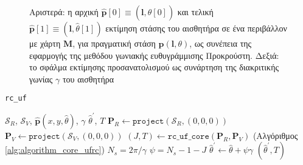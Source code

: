 \begin{figure}[h]\centering
  \vspace{0.5cm}
  
  \vspace{0.5cm}
  \caption{\small Αριστερά: η αρχική
           $\hat{\bm{p}}[0] \equiv (\bm{l},\hat{\theta}[0])$ και τελική
           $\hat{\bm{p}}[1] \equiv (\bm{l},\hat{\theta}[1])$ εκτίμηση στάσης του
           αισθητήρα σε ένα περιβάλλον με χάρτη $\bm{M}$, για πραγματική στάση
           $\bm{p}(\bm{l},\theta)$, ως συνέπεια της εφαρμογής της μεθόδου
           γωνιακής ευθυγράμμισης Προκρούστη. Δεξιά: το σφάλμα εκτίμησης
           προσανατολισμού ως συνάρτηση της διακριτικής γωνίας $\gamma$ του
           αισθητήρα}
  \label{fig:02_04_02:rc_uf}
\end{figure}


\begin{algorithm}[h]
  \caption{\texttt{rc\_uf}}
  \begin{spacing}{1.3}
  \begin{algorithmic}[1]
    \REQUIRE $\mathcal{S}_R$, $\mathcal{S}_V$, $\hat{\bm{p}}(x, y, \hat{\theta})$, $\gamma$
    \ENSURE $\hat{\theta}^\prime$, $T$
    \STATE $\bm{P}_R \leftarrow \texttt{project}(\mathcal{S}_R, (0,0,0))$
    \STATE $\bm{P}_V \leftarrow \texttt{project}(\mathcal{S}_V, (0,0,0))$
    \STATE $(J,T) \leftarrow \texttt{rc\_uf\_core}(\bm{P}_R, \bm{P}_V)$ (Αλγόριθμος \ref{alg:algorithm_core_ufrc})
    \STATE $N_s = 2 \pi / \gamma$
    \STATE $\psi = N_s - 1 - J$
    \STATE $\hat{\theta}^\prime \leftarrow \hat{\theta} + \psi \gamma$
    \RETURN $(\hat{\theta}^\prime, T)$
  \end{algorithmic}
  \end{spacing}
  \label{alg:algorithm_ufrc}
\end{algorithm}


